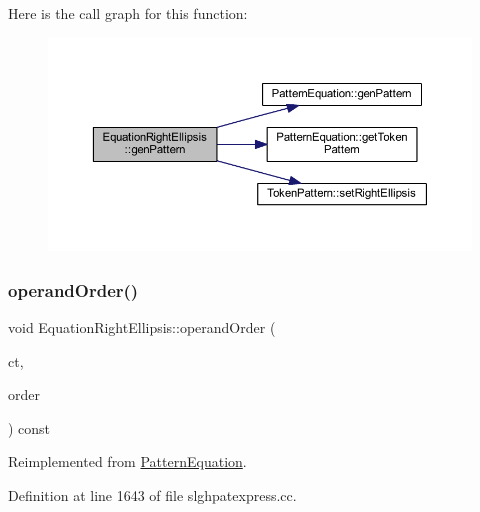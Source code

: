 Here is the call graph for this function\+:
\nopagebreak
\begin{figure}[H]
\begin{center}
\leavevmode
\includegraphics[width=350pt]{class_equation_right_ellipsis_ae250ac9079b2f1d60f5b295095abe36f_cgraph}
\end{center}
\end{figure}
\mbox{\label{class_equation_right_ellipsis_a43707cb523898b0a1b7d7cc1c7dbb779}} 
\subsubsection{\texorpdfstring{operandOrder()}{operandOrder()}}
{\footnotesize\ttfamily void Equation\+Right\+Ellipsis\+::operand\+Order (\begin{DoxyParamCaption}\item[{\mbox{\hyperlink{class_constructor}{Constructor}} $\ast$}]{ct,  }\item[{vector$<$ \mbox{\hyperlink{class_operand_symbol}{Operand\+Symbol}} $\ast$ $>$ \&}]{order }\end{DoxyParamCaption}) const\hspace{0.3cm}{\ttfamily [virtual]}}



Reimplemented from \mbox{\hyperlink{class_pattern_equation_a944d7114e5d5b6876352e555cc060829}{Pattern\+Equation}}.



Definition at line 1643 of file slghpatexpress.\+cc.

